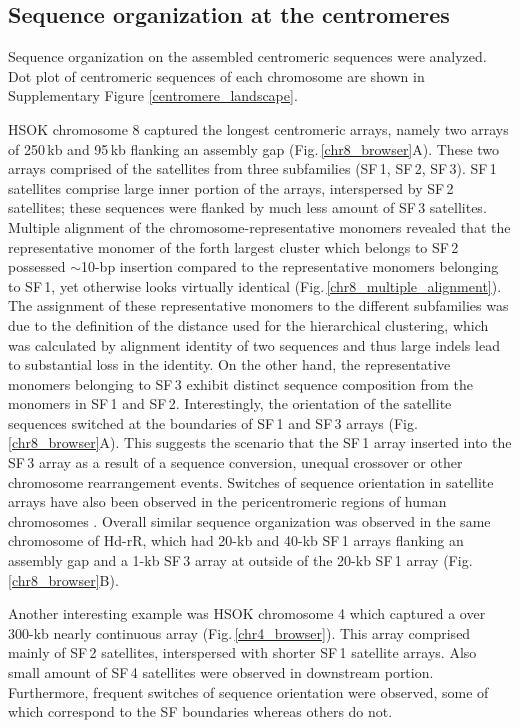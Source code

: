 \subsection*{Sequence organization at the centromeres}
  Sequence organization on the assembled centromeric sequences were analyzed. Dot plot of centromeric sequences of each chromosome are shown in Supplementary Figure \ref{centromere_landscape}.

  HSOK chromosome 8 captured the longest centromeric arrays, namely two arrays of 250\,kb and 95\,kb flanking an assembly gap (Fig.\,\ref{chr8_browser}A). These two arrays comprised of the satellites from three subfamilies (SF\,1, SF\,2, SF\,3). SF\,1 satellites comprise large inner portion of the arrays, interspersed by SF\,2 satellites; these sequences were flanked by much less amount of SF\,3 satellites. Multiple alignment of the chromosome-representative monomers revealed that the representative monomer of the forth largest cluster which belongs to SF\,2 possessed $\sim$10-bp insertion compared to the representative monomers belonging to SF\,1, yet otherwise looks virtually identical (Fig.\,\ref{chr8_multiple_alignment}). The assignment of these representative monomers to the different subfamilies was due to the definition of the distance used for the hierarchical clustering, which was calculated by alignment identity of two sequences and thus large indels lead to substantial loss in the identity. On the other hand, the representative monomers belonging to SF\,3 exhibit distinct sequence composition from the monomers in SF\,1 and SF\,2. Interestingly, the orientation of the satellite sequences switched at the boundaries of SF\,1 and SF\,3 arrays (Fig.\,\ref{chr8_browser}A). This suggests the scenario that the SF\,1 array inserted into the SF\,3 array as a result of a sequence conversion, unequal crossover or other chromosome rearrangement events. Switches of sequence orientation in satellite arrays have also been observed in the pericentromeric regions of human chromosomes \cite{M.KatharineRuddand2004}. Overall similar sequence organization was observed in the same chromosome of Hd-rR, which had 20-kb and 40-kb SF\,1 arrays flanking an assembly gap and a 1-kb SF\,3 array at outside of the 20-kb SF\,1 array (Fig.\,\ref{chr8_browser}B).

  Another interesting example was HSOK chromosome 4 which captured a over 300-kb nearly continuous array (Fig.\,\ref{chr4_browser}). This array comprised mainly of SF\,2 satellites, interspersed with shorter SF\,1 satellite arrays. Also small amount of SF\,4 satellites were observed in downstream portion. Furthermore, frequent switches of sequence orientation were observed, some of which correspond to the SF boundaries whereas others do not.

